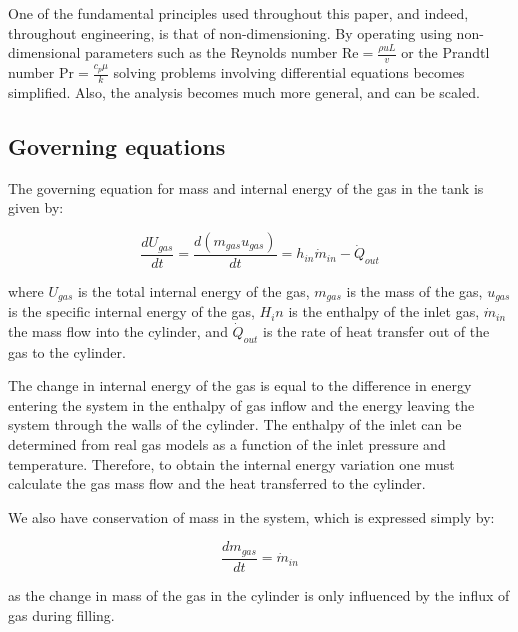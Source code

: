 
One of the fundamental principles used throughout this paper, and indeed, throughout engineering, is that of non-dimensioning. By operating using non-dimensional parameters such as the Reynolds number $\text{Re} = \frac{\rho u L}{v}$ or the Prandtl number $\text{Pr} = \frac{c_p \mu}{k}$ solving problems involving differential equations becomes simplified. Also, the analysis becomes much more general, and can be scaled.

\subsection{Governing equations}

The governing equation for mass and internal energy of the gas in the tank is given by:

\begin{equation}
\frac{dU_{gas}}{dt} = \frac{d\left(m_{gas}u_{gas}\right)}{dt} = h_{in}\dot m_{in} - \dot Q_{out}
\end{equation}


\noindent where $U_{gas}$ is the total internal energy of the gas, $m_{gas}$ is the mass of the gas, $u_{gas}$ is the specific internal energy of the gas, $H_in$ is the enthalpy of the inlet gas, $\dot m_{in}$ the mass flow into the cylinder, and $\dot Q_{out}$ is the rate of heat transfer out of the gas to the cylinder.

The change in internal energy of the gas is equal to the difference in energy entering the system in the enthalpy of gas inflow and the energy leaving the system through the walls of the cylinder. The enthalpy of the inlet can be determined from real gas models as a function of the inlet pressure and temperature. Therefore, to obtain the internal energy variation one must calculate the gas mass flow and the heat transferred to the cylinder.

We also have conservation of mass in the system, which is expressed simply by:

\begin{equation}
\frac{dm_{gas}}{dt} = \dot m_{in}
\end{equation}

\noindent as the change in mass of the gas in the cylinder is only influenced by the influx of gas during filling.

